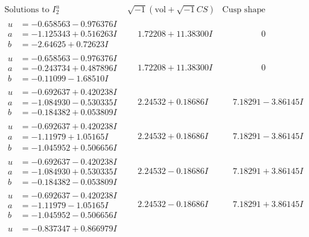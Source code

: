 \documentclass[1p]{elsarticle_modified}
\theoremstyle{definition}
\newcommand{\I}{\sqrt{-1}}
\begin{document}
$$\begin{array}{c|c|c}
\text{Solutions to }I^u_{2}& \I (\text{vol} + \sqrt{-1}CS) & \text{Cusp shape}\\
 \hline 
\begin{aligned}
u &= -0.658563 - 0.976376 I \\
a &= -1.125343 + 0.516263 I \\
b &= -2.64625 + 0.72623 I\end{aligned}
 & \phantom{-}1.72208 + 11.38300 I & \phantom{-0.000000 } 0 \\ \hline\begin{aligned}
u &= -0.658563 - 0.976376 I \\
a &= -0.243734 + 0.487896 I \\
b &= -0.11099 - 1.68510 I\end{aligned}
 & \phantom{-}1.72208 + 11.38300 I & \phantom{-0.000000 } 0 \\ \hline\begin{aligned}
u &= -0.692637 + 0.420238 I \\
a &= -1.084930 - 0.530335 I \\
b &= -0.184382 + 0.053809 I\end{aligned}
 & \phantom{-}2.24532 + 0.18686 I & \phantom{-}7.18291 - 3.86145 I \\ \hline\begin{aligned}
u &= -0.692637 + 0.420238 I \\
a &= -1.11979 + 1.05165 I \\
b &= -1.045952 + 0.506656 I\end{aligned}
 & \phantom{-}2.24532 + 0.18686 I & \phantom{-}7.18291 - 3.86145 I \\ \hline\begin{aligned}
u &= -0.692637 - 0.420238 I \\
a &= -1.084930 + 0.530335 I \\
b &= -0.184382 - 0.053809 I\end{aligned}
 & \phantom{-}2.24532 - 0.18686 I & \phantom{-}7.18291 + 3.86145 I \\ \hline\begin{aligned}
u &= -0.692637 - 0.420238 I \\
a &= -1.11979 - 1.05165 I \\
b &= -1.045952 - 0.506656 I\end{aligned}
 & \phantom{-}2.24532 - 0.18686 I & \phantom{-}7.18291 + 3.86145 I \\ \hline\begin{aligned}
u &= -0.837347 + 0.866979 I \\

\end{aligned}
\end{array}$$
\end{document}
